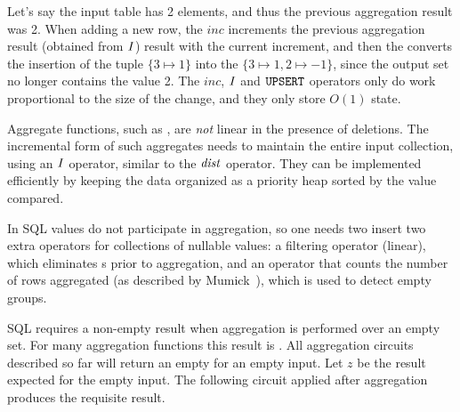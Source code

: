 Let's say the input table  has 2 elements, and thus the
previous aggregation result was 2.  When adding a new row, the
$\mathit{inc}$ increments the previous aggregation result (obtained
from $\mathit{I}$) result with the current increment, and then the
 converts the insertion of the tuple $\{3 \mapsto 1\}$
into the \zr $\{3 \mapsto 1, 2 \mapsto -1 \}$, since the output set no
longer contains the value 2.  The $\mathit{inc}$, $\mathit{I}$ and $\mbox{\texttt{UPSERT}}$
operators only do work proportional to the size of the change, and
they only store $O(1)$ state.


%

Aggregate functions, such as , are \emph{not} linear in the
presence of deletions.  The incremental form of such aggregates needs
to maintain the entire input collection, using an $\mathit{I}$ operator,
similar to the $\mathit{dist}$ operator.  They can be implemented
efficiently by keeping the data organized as a priority heap sorted by
the value compared.

In SQL  values do not participate in aggregation, so one
needs two insert two extra operators for collections of nullable
values: a filtering operator (linear), which eliminates s
prior to aggregation, and an operator that counts the number of rows
aggregated (as described by Mumick~\cite{mumick-sigmod97}), which is
used to detect empty groups.

SQL requires a non-empty result when aggregation is performed over an
empty set.  For many aggregation functions this result is .
All aggregation circuits described so far will return an empty \zr for
an empty input.  Let $z$ be the result expected for the empty input.
The following circuit applied after aggregation produces the requisite
result.

